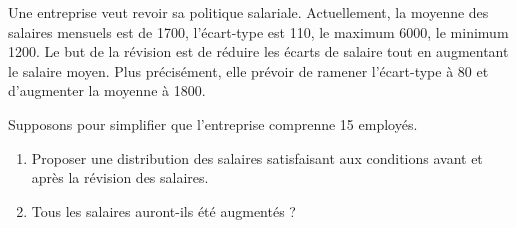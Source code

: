 
\begin{exercice}\label{exosmath-0248}

Une entreprise veut revoir sa politique salariale. Actuellement, la moyenne des salaires mensuels est de 1700, l'écart-type est 110, le maximum 6000, le minimum 1200.  
Le but de la révision est de réduire les écarts de salaire tout en augmentant le salaire moyen. Plus précisément, elle prévoir de ramener l'écart-type à 80 et d'augmenter la moyenne à 1800. 

Supposons pour simplifier que l'entreprise comprenne 15 employés.

\begin{enumerate}
    \item
        Proposer une distribution des salaires satisfaisant aux conditions avant et après la révision des salaires.
    \item
        Tous les salaires auront-ils été augmentés ?
\end{enumerate}

\end{exercice}
